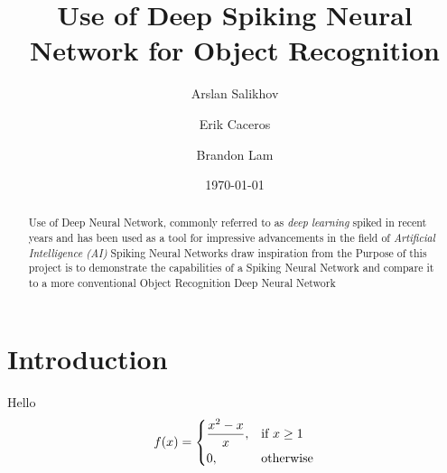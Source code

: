 \documentclass{article}
\title{Use of Deep Spiking Neural Network for Object Recognition}
\author{Arslan Salikhov  \\
	\and 
	Erik Caceros \\
	\and
	Brandon Lam \\
	}
\date{\today}
\begin{document}
\begin{titlingpage}
\maketitle
\end{titlingpage}


\begin{abstract}
Use of Deep Neural Network, commonly referred to as
\emph{deep learning} spiked in recent years and has been used
as a tool for impressive advancements in the field of 
\emph{Artificial Intelligence (AI)}
Spiking Neural Networks draw inspiration from the 
Purpose of this project is to demonstrate the capabilities of a 
Spiking Neural Network and compare it to a more conventional 
Object Recognition Deep Neural Network
\end{abstract}

\section{Introduction}
Hello 
\[
    f(x)= 
\begin{dcases}
    \frac{x^2-x}{x},& \text{if } x\geq 1\\
    0,              & \text{otherwise}
\end{dcases}
\]
\end{document}
